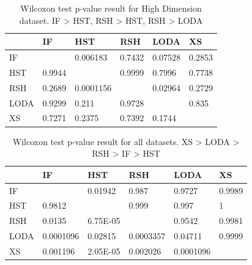  \begin{table}
 \centering
     \begin{tabular}{|l|lllll|}
     \hline
      & IF     & HST       & RSH    & LODA    & XS     \\	\hline
    IF   & ~      & 0.006183  & 0.7432 & 0.07528 & 0.2853 \\
    HST  & 0.9944 & ~         & 0.9999 & 0.7996  & 0.7738 \\
    RSH  & 0.2689 & 0.0001156 & ~      & 0.02964 & 0.2729 \\
    LODA & 0.9299 & 0.211     & 0.9728 & ~       & 0.835  \\
    XS   & 0.7271 & 0.2375    & 0.7392 & 0.1744  & ~      \\
    \hline
    \end{tabular}
     \caption{Wilcoxon test p-value result for High Dimension dataset. IF > HST, RSH > HST, RSH > LODA}
 \end{table}

 \begin{table}
 \centering
     \begin{tabular}{|l|lllll|}
     \hline
     & IF        & HST      & RSH       & LODA      & XS     \\	\hline
    IF   & ~         & 0.01942  & 0.987     & 0.9727    & 0.9989 \\
    HST  & 0.9812    & ~        & 0.999     & 0.997     & 1      \\
    RSH  & 0.0135    & 6.75E-05 & ~         & 0.9542    & 0.9981 \\
    LODA & 0.0001096 & 0.02815  & 0.0003357 & 0.04711   & 0.9999 \\
    XS   & 0.001196  & 2.05E-05 & 0.002026  & 0.0001096 & ~      \\    \hline
\end{tabular}
     \caption{Wilcoxon test p-value result for all datasets. XS > LODA > RSH > IF > HST}
 \end{table}


